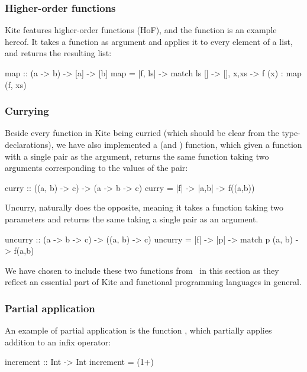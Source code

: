 \subsubsection{Higher-order functions}
Kite features higher-order functions (HoF), and the  function is an example hereof. It takes a function as argument and applies it to every element of a list, and returns the resulting list:

\begin{kite}
map :: (a -> b) -> [a] -> [b]
map = |f, ls| -> {
  match ls {
    [] -> [],
    x,xs -> f (x) : map (f, xs)
  }
}
\end{kite}

\subsubsection{Currying}
\label{subsubsec:currying}
Beside every function in Kite being curried (which should be clear from the type-declarations), we have also implemented a  (and ) function, which given a function with a single pair as the argument, returns the same function taking two arguments corresponding to the values of the pair:

\begin{kite}
curry :: ((a, b) -> c) -> (a -> b -> c)
curry = |f| -> {
  |a,b| -> {
    f((a,b))
  }
}
\end{kite}

Uncurry, naturally does the opposite, meaning it takes a function taking two parameters and returns the same taking a single pair as an argument.

\begin{kite}
uncurry :: (a -> b -> c) -> ((a, b) -> c)
uncurry = |f| -> {
  |p| -> {
    match p {
      (a, b) -> f(a,b)
    }
  }
}
\end{kite}

We have chosen to include these two functions from~ in this section as they reflect an essential part of Kite and functional programming languages in general.

\subsubsection{Partial application}
\label{sec:kite-design-partial-app}
An example of partial application is the function , which partially applies addition to an infix operator:

\begin{kite}
increment :: Int -> Int
increment = (1+)
\end{kite}

